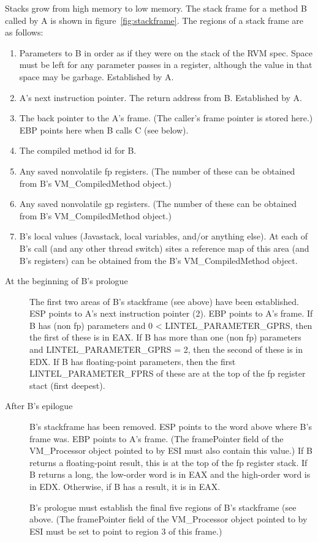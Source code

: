 Stacks grow from high memory to low memory.  The stack frame for a method
B called by A is shown in figure~\ref{fig:stackframe}. The regions of
a stack frame are as follows:
\begin{enumerate}
\item Parameters to B in order as if they were on the stack of the RVM spec.
     Space must be left for any parameter passes in a register, although
     the value in that space may be garbage.  Established by A.
\item A's next instruction pointer.  The return address from B.
     Established by A.
\item The back pointer to the A's frame.  (The caller's frame pointer is
     stored here.)  EBP points here when B calls C (see below).
\item The compiled method id for B. 
\item Any saved nonvolatile fp registers.  (The number of these can be obtained
     from B's VM\_CompiledMethod object.)
\item Any saved nonvolatile gp registers.  (The number of these can be obtained
     from B's VM\_CompiledMethod object.)
\item B's local values (Java\trademark stack, local variables, and/or anything else).
     At each of B's call (and any other thread switch) sites a reference
     map of this area (and B's registers) can be obtained from the B's
     VM\_CompiledMethod object.
\end{enumerate}



\begin{description}
\item[At the beginning of B's prologue]
The first two areas of B's stackframe (see above) have been
     established.  ESP points to A's next instruction pointer (2).
     EBP points to A's frame.  If B has (non fp) parameters and
     0 < LINTEL\_PARAMETER\_GPRS, then the first of these is in EAX.
     If B has more than one (non fp) parameters and
     LINTEL\_PARAMETER\_GPRS = 2, then the second of these is in EDX.
     If B has floating-point parameters, then the first
     LINTEL\_PARAMETER\_FPRS of these are at the top of the fp register
     stact (first deepest).
\item[After B's epilogue]
B's stackframe has been removed.  ESP points to the word above where
     B's frame was.  EBP points to A's frame.  (The framePointer field
     of the VM\_Processor object pointed to by ESI must also contain
     this value.)  If B returns a floating-point result, this is at
     the top of the fp register stack.  If B returns a long, the
     low-order word is in EAX and the high-order word is in EDX.
     Otherwise, if B has a result, it is in EAX.

B's prologue must establish the final five regions of B's stackframe
(see above.  (The framePointer field of the VM\_Processor object
pointed to by ESI must be set to point to region 3 of this frame.)

\end{description}



